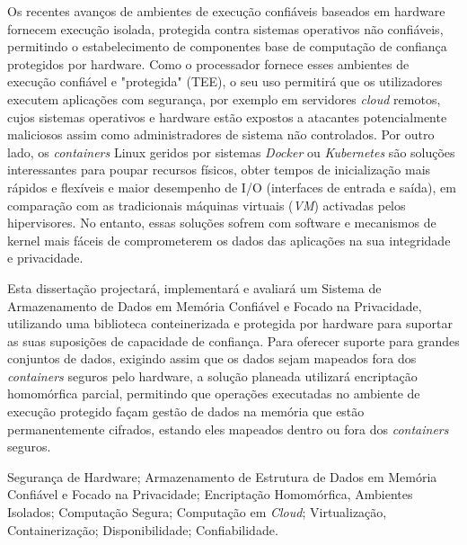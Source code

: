 Os recentes avanços de ambientes de execução confiáveis baseados em hardware fornecem execução isolada, protegida contra sistemas operativos não confiáveis, permitindo o estabelecimento de componentes base de computação de confiança protegidos por hardware. Como o processador fornece esses ambientes de execução confiável e "protegida" (TEE), o seu uso permitirá que os utilizadores executem aplicações com segurança, por exemplo em servidores \textit{cloud} remotos, cujos sistemas operativos e hardware estão expostos a atacantes potencialmente maliciosos assim como administradores de sistema não controlados.
Por outro lado, os \textit{containers} Linux geridos por sistemas \textit{Docker} ou \textit{Kubernetes} são soluções interessantes para poupar recursos físicos, obter tempos de inicialização mais rápidos e flexíveis e maior desempenho de I/O (interfaces de entrada e saída), em comparação com as tradicionais máquinas virtuais (\textit{VM}) activadas pelos hipervisores. No entanto, essas soluções sofrem com software e mecanismos de kernel mais fáceis de comprometerem os dados das aplicações na sua integridade e privacidade.

Esta dissertação projectará, implementará e avaliará um Sistema de  Armazenamento de Dados em Memória Confiável e Focado na Privacidade, utilizando uma biblioteca conteinerizada e protegida por hardware para suportar as suas suposições de capacidade de confiança. Para oferecer suporte para grandes conjuntos de dados, exigindo assim que os dados sejam mapeados fora dos \textit{containers} seguros pelo hardware, a solução planeada utilizará encriptação homomórfica parcial, permitindo que operações executadas no ambiente de execução protegido façam gestão de dados na memória que estão permanentemente cifrados, estando eles mapeados dentro ou fora dos \textit{containers} seguros.

\begin{keywords}
Segurança de Hardware; Armazenamento de Estrutura de Dados em Memória Confiável e Focado na Privacidade; Encriptação Homomórfica, Ambientes Isolados; Computação Segura; Computação em \textit{Cloud}; Virtualização, Containerização; Disponibilidade; Confiabilidade.
\end{keywords} 
